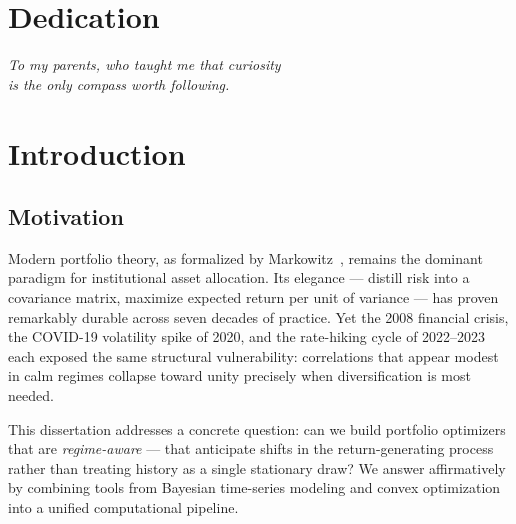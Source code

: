 \documentclass[12pt,oneside]{book}
\begin{document}
\newpage

\chapter*{Dedication}

\begin{center}
\itshape
To my parents, who taught me that curiosity\\
is the only compass worth following.
\end{center}

\newpage

\setcounter{page}{1}
\renewcommand{\contentsname}{Table of Contents}
\tableofcontents
\newpage

\listoftables
{}
\newpage

\listoffigures
{}
\newpage

\chapter{Introduction}

\section{Motivation}

Modern portfolio theory, as formalized by Markowitz~\cite{markowitz1952}, remains the dominant paradigm for institutional asset allocation. Its elegance --- distill risk into a covariance matrix, maximize expected return per unit of variance --- has proven remarkably durable across seven decades of practice. Yet the 2008 financial crisis, the COVID-19 volatility spike of 2020, and the rate-hiking cycle of 2022--2023 each exposed the same structural vulnerability: correlations that appear modest in calm regimes collapse toward unity precisely when diversification is most needed.

This dissertation addresses a concrete question: can we build portfolio optimizers that are \textit{regime-aware} --- that anticipate shifts in the return-generating process rather than treating history as a single stationary draw? We answer affirmatively by combining tools from Bayesian time-series modeling and convex optimization into a unified computational pipeline.
\end{document}
